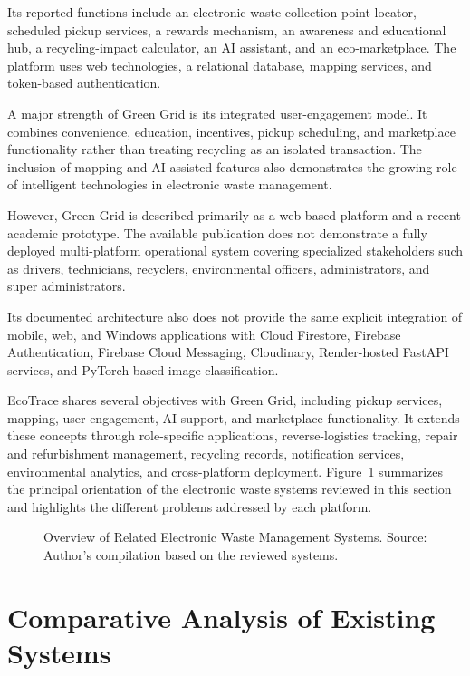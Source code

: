 Its reported functions include an electronic waste collection-point locator,
scheduled pickup services, a rewards mechanism, an awareness and educational
hub, a recycling-impact calculator, an AI assistant, and an eco-marketplace. The
platform uses web technologies, a relational database, mapping services, and
token-based authentication.

A major strength of Green Grid is its integrated user-engagement model. It
combines convenience, education, incentives, pickup scheduling, and
marketplace functionality rather than treating recycling as an isolated
transaction. The inclusion of mapping and AI-assisted features also demonstrates
the growing role of intelligent technologies in electronic waste management.

However, Green Grid is described primarily as a web-based platform and a
recent academic prototype. The available publication does not demonstrate a
fully deployed multi-platform operational system covering specialized
stakeholders such as drivers, technicians, recyclers, environmental officers,
administrators, and super administrators.

Its documented architecture also does not provide the same explicit
integration of mobile, web, and Windows applications with Cloud Firestore,
Firebase Authentication, Firebase Cloud Messaging, Cloudinary, Render-hosted
FastAPI services, and PyTorch-based image classification.

EcoTrace shares several objectives with Green Grid, including pickup services,
mapping, user engagement, AI support, and marketplace functionality. It extends
these concepts through role-specific applications, reverse-logistics tracking,
repair and refurbishment management, recycling records, notification services,
environmental analytics, and cross-platform deployment.
Figure~\ref{fig:related-systems} summarizes the principal orientation of the
electronic waste systems reviewed in this section and highlights the different
problems addressed by each platform.

\begin{figure}[H]
  \centering
  \caption{Overview of Related Electronic Waste Management Systems. Source: Author's compilation based on the reviewed systems.}
  \label{fig:related-systems}
\end{figure}

\section{Comparative Analysis of Existing Systems}

